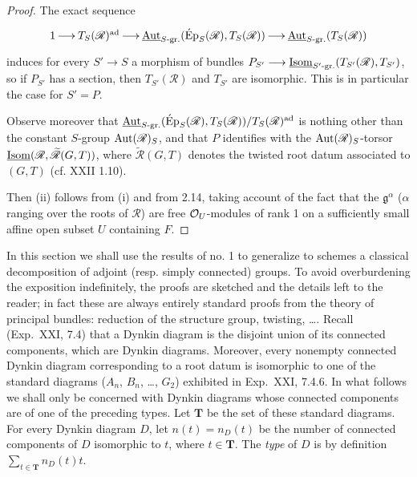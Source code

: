 \begin{proof}
The exact sequence
\[
\xymatrix@C=1.4em{1\ar[r]&T_S(\mathscr R)^{\mathrm{ad}}\ar[r]&\underline{\Aut}_{S\text{-gr.}}(\operatorname{\acute Ep}_S(\mathscr R),T_S(\mathscr R))\ar[r]&\underline{\Aut}_{S\text{-gr.}}(T_S(\mathscr R))}
\]
induces for every $S'\to S$ a morphism of bundles $P_{S'}\longrightarrow\underline{\operatorname{Isom}}_{S'\text{-gr.}}(T_{S'}(\mathscr R),T_{S'})$, so if $P_{S'}$ has a section, then $T_{S'}(\mathscr R)$ and $T_{S'}$ are isomorphic. This is in particular the case for $S'=P$.

Observe moreover that $\underline{\operatorname{Aut}}_{S\text{-gr.}}(\operatorname{\acute Ep}_S(\mathscr R),T_S(\mathscr R))/T_S(\mathscr R)^{\mathrm{ad}}$ is nothing other than the constant $S$-group $\operatorname{Aut}(\mathscr R)_S$, and that $P$ identifies with the $\operatorname{Aut}(\mathscr R)_S$-torsor $\underline{\operatorname{Isom}}(\mathscr R,\widetilde{\mathscr R}(G,T))$, where $\widetilde{\mathscr R}(G,T)$ denotes the twisted root datum associated to $(G,T)$ (cf. XXII 1.10).

Then (ii) follows from (i) and from 2.14, taking account of the fact that the $\mathfrak g^\alpha$ ($\alpha$ ranging over the roots of $\mathscr R$) are free $\mathcal{O}_U$-modules of rank 1 on a sufficiently small affine open subset $U$ containing $F$.
\end{proof}

In this section we shall use the results of no. 1 to generalize to schemes a classical decomposition of adjoint (resp. simply connected) groups. To avoid overburdening the exposition indefinitely, the proofs are sketched and the details left to the reader; in fact these are always entirely standard proofs from the theory of principal bundles: reduction of the structure group, twisting, \ldots.
\label{XXIV.5.1}
Recall (Exp.~XXI, 7.4) that a Dynkin diagram is the disjoint union of its connected components, which are Dynkin diagrams. Moreover, every nonempty connected Dynkin diagram corresponding to a root datum is isomorphic to one of the standard diagrams ($A_n$, $B_n$, \ldots, $G_2$) exhibited in Exp.~XXI, 7.4.6. In what follows we shall only be concerned with Dynkin diagrams whose connected components are of one of the preceding types. Let $\mathbf T$ be the set of these standard diagrams. For every Dynkin diagram $D$, let $n(t)=n_D(t)$ be the number of connected components of $D$ isomorphic to $t$, where $t\in\mathbf T$. The \emph{type} of $D$ is by definition $\sum_{t\in\mathbf T}n_D(t)t$.

